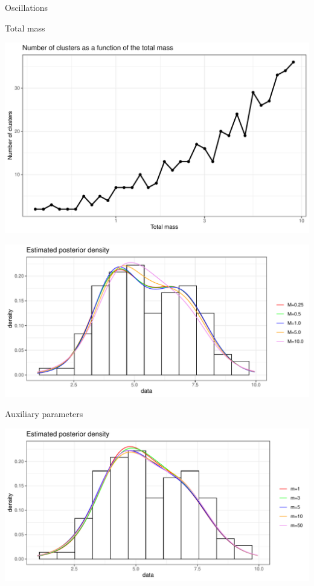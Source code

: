 \begin{frame}{Oscillations}
\end{frame}

\begin{frame}{Total mass}

\begin{center}
		\includegraphics[scale=0.35]{etc/num_clust_M.pdf}
	\end{center}


\begin{center}
		\includegraphics[scale=0.35]{etc/dens_withMm3.pdf}
	\end{center}
\end{frame}



\begin{frame}{Auxiliary parameters}

\begin{center}
		\includegraphics[scale=0.5]{etc/dens_withmM10.pdf}
	\end{center}
\end{frame}


